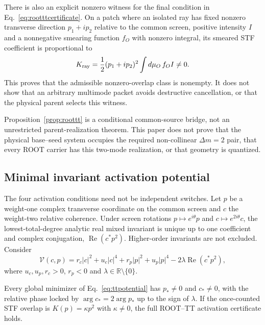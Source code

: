 There is also an explicit nonzero witness for the final condition in
Eq.~\eqref{eq:rootttcertificate}.  On a patch where an isolated ray has fixed
nonzero transverse direction $p_1+ip_2$ relative to the common screen,
positive intensity $I$ and a nonnegative smearing function $f_O$ with
nonzero integral, its smeared STF coefficient is proportional to
\begin{equation}
 K_{\rm ray}=\frac{1}{2}(p_1+ip_2)^2
 \int d\mu_O\,f_O I\neq0.
\label{eq:nonzerokwitness}
\end{equation}
This proves that the admissible nonzero-overlap class is nonempty.  It does
not show that an arbitrary multimode packet avoids destructive cancellation,
or that the physical parent selects this witness.

Proposition~\ref{prop:roottt} is a conditional common-source bridge, not an
unrestricted parent-realization theorem.  This paper does not prove that the physical
base--seed system occupies the required non-collinear $\Delta m=2$ pair, that
every ROOT carrier has this two-mode realization, or that geometry is
quantized.

\subsection{Minimal invariant activation potential}

The four activation conditions need not be independent switches.  Let $p$ be
a weight-one complex transverse coordinate on the common screen and $c$ the
weight-two relative coherence.  Under screen rotations
$p\mapsto e^{i\theta}p$ and $c\mapsto e^{2i\theta}c$, the
lowest-total-degree analytic real mixed invariant is unique up to one
coefficient and complex conjugation, $\operatorname{Re}(c^*p^2)$.
Higher-order invariants are not excluded.  Consider
\begin{equation}
\mathcal V(c,p)=r_c|c|^2+u_c|c|^4+r_p|p|^2+u_p|p|^4
-2\lambda\operatorname{Re}(c^*p^2),
\label{eq:ttpotential}
\end{equation}
where $u_c,u_p,r_c>0$, $r_p<0$ and
$\lambda\in\mathbb R\setminus\{0\}$.

\begin{proposition}
\label{prop:ttpotential}
Every global minimizer of Eq.~\eqref{eq:ttpotential} has $p_*\neq0$ and
$c_*\neq0$, with the relative phase locked by
$\arg c_*=2\arg p_*$ up to the sign of $\lambda$.  If the once-counted STF
overlap is $K(p)=\kappa p^2$ with $\kappa\neq0$, the full ROOT--TT activation
certificate holds.
\end{proposition}

